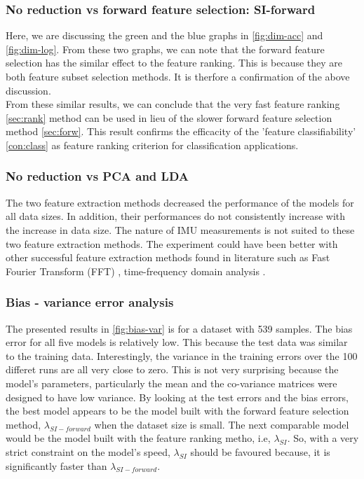 \subsubsection{No reduction vs forward feature selection: SI-forward}
Here, we are discussing the green and the blue graphs in \ref{fig:dim-acc} and \ref{fig:dim-log}. From these two graphs, we can note that the forward feature selection has the similar effect to the feature ranking. This is because they are both feature subset selection methods. It is therfore a confirmation of the above discussion.\\
From these similar results, we can conclude that the very fast feature ranking \ref{sec:rank} method can be used in lieu of the slower forward feature selection method \ref{sec:forw}. This result confirms the efficacity of the 'feature classifiability' \ref{con:class} as feature ranking criterion for classification applications.

\subsubsection{No reduction vs PCA and LDA}

The two feature extraction methods decreased the performance of the models for all data sizes. In addition, their performances do not consistently increase with the increase in data size. The nature of IMU measurements is not suited to these two feature extraction methods. The experiment could have been better with other successful feature extraction methods found in literature such as Fast Fourier Transform (FFT) \cite{towa2009},
time-frequency domain analysis \cite{ches2012}.

\subsubsection{Bias - variance error analysis}
The presented results in \ref{fig:bias-var} is for a dataset with 539 samples.
The bias error for all five models is relatively low. This because the test data was similar to the training data. 
Interestingly, the variance in the training errors over the 100 differet runs are all very close to zero. This is not very surprising because the model's parameters, particularly the mean and the co-variance matrices were designed to have low variance. %
By looking at the test errors and the bias errors, the best model appears to be the model built with the forward feature selection method, \(\lambda_{SI-forward}\) when the dataset size is small. The next comparable model would be the model built with the feature ranking metho, i.e, \(\lambda_{SI}\). So, with a very strict constraint on the model's speed, \(\lambda_{SI}\) should be favoured because, it is significantly faster than \(\lambda_{SI-forward}\).

